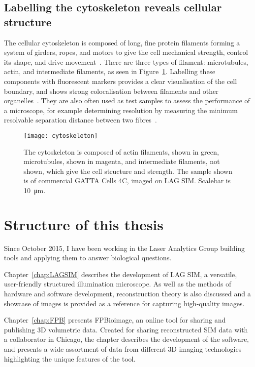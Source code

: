 \subsection{Labelling the cytoskeleton reveals cellular structure} \label{sec:cytoskeleton}
The cellular cytoskeleton is composed of long, fine protein filaments forming a system of girders, ropes, and motors to give the cell mechanical strength, control its shape, and drive movement~\cite{alberts2013essential}.
There are three types of filament: microtubules, actin, and intermediate filaments, as seen in Figure~\ref{fig:cytoskeleton}. 
Labelling these components with fluorescent markers provides a clear visualisation of the cell boundary, and shows strong colocalisation between filaments and other organelles~\cite{melkov2017regulation}. 
They are also often used as test samples to assess the performance of a microscope, for example determining resolution by measuring the minimum resolvable separation distance between two fibres~\cite{dyba2003immunofluorescence, wegel2016imaging}. 

\begin{figure}[htbp!]
\centering
\texttt{[image: cytoskeleton]}
\caption[Introduction: The cytoskeleton gives the cell structure and strength]{The cytoskeleton is composed of actin filaments, shown in green, microtubules, shown in magenta, and intermediate filaments, not shown, which give the cell structure and strength. The sample shown is of commercial GATTA Cells 4C, imaged on LAG SIM. Scalebar is \SI{10}{\micro\metre}.}
\label{fig:cytoskeleton}
\end{figure}

\section{Structure of this thesis}

Since October 2015, I have been working in the Laser Analytics Group building tools and applying them to answer biological questions. 

Chapter~\ref{chap:LAGSIM} describes the development of LAG SIM, a versatile, user-friendly structured illumination microscope. 
As well as the methods of hardware and software development, reconstruction theory is also discussed and a showcase of images is provided as a reference for capturing high-quality images. 

Chapter~\ref{chap:FPB} presents FPBioimage, an online tool for sharing and publishing 3D volumetric data. 
Created for sharing reconstructed SIM data with a collaborator in Chicago, the chapter describes the development of the software, and presents a wide assortment of data from different 3D imaging technologies highlighting the unique features of the tool. 

